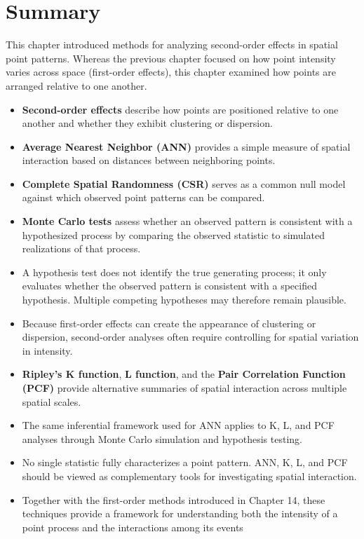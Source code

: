 \documentclass[
  letterpaper,
]{book}
\begin{document}
\section{Summary}\label{summary-13}

This chapter introduced methods for analyzing second-order effects in
spatial point patterns. Whereas the previous chapter focused on how
point intensity varies across space (first-order effects), this chapter
examined how points are arranged relative to one another.

\begin{itemize}
\item
  \textbf{Second-order effects} describe how points are positioned
  relative to one another and whether they exhibit clustering or
  dispersion.
\item
  \textbf{Average Nearest Neighbor (ANN)} provides a simple measure of
  spatial interaction based on distances between neighboring points.
\item
  \textbf{Complete Spatial Randomness (CSR)} serves as a common null
  model against which observed point patterns can be compared.
\item
  \textbf{Monte Carlo tests} assess whether an observed pattern is
  consistent with a hypothesized process by comparing the observed
  statistic to simulated realizations of that process.
\item
  A hypothesis test does not identify the true generating process; it
  only evaluates whether the observed pattern is consistent with a
  specified hypothesis. Multiple competing hypotheses may therefore
  remain plausible.
\item
  Because first-order effects can create the appearance of clustering or
  dispersion, second-order analyses often require controlling for
  spatial variation in intensity.
\item
  \textbf{Ripley's K function}, \textbf{L function}, and the
  \textbf{Pair Correlation Function (PCF)} provide alternative summaries
  of spatial interaction across multiple spatial scales.
\item
  The same inferential framework used for ANN applies to K, L, and PCF
  analyses through Monte Carlo simulation and hypothesis testing.
\item
  No single statistic fully characterizes a point pattern. ANN, K, L,
  and PCF should be viewed as complementary tools for investigating
  spatial interaction.
\item
  Together with the first-order methods introduced in Chapter 14, these
  techniques provide a framework for understanding both the intensity of
  a point process and the interactions among its events
\end{itemize}
\end{document}
